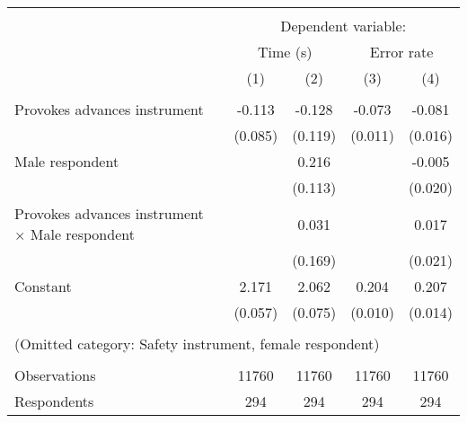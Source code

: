 {\begin{tabular}{l*{4}{c}} \hline\hline \\[-1.8ex] & \multicolumn{4}{c}{Dependent variable:} \\
                    &\multicolumn{2}{c}{Time (s)}               &\multicolumn{2}{c}{Error rate}             \\\cmidrule(lr){2-3}\cmidrule(lr){4-5}
                    &\multicolumn{1}{c}{(1)}         &\multicolumn{1}{c}{(2)}         &\multicolumn{1}{c}{(3)}         &\multicolumn{1}{c}{(4)}         \\
\hline \\[-1.8ex]
Provokes advances instrument&      -0.113         &      -0.128         &      -0.073\sym{***}&      -0.081\sym{***}\\
                    &     (0.085)         &     (0.119)         &     (0.011)         &     (0.016)         \\
[1em]
Male respondent     &                     &       0.216\sym{*}  &                     &      -0.005         \\
                    &                     &     (0.113)         &                     &     (0.020)         \\
[1em]
Provokes advances instrument $\times$ Male respondent&                     &       0.031         &                     &       0.017         \\
                    &                     &     (0.169)         &                     &     (0.021)         \\
[1em]
Constant            &       2.171\sym{***}&       2.062\sym{***}&       0.204\sym{***}&       0.207\sym{***}\\
                    &     (0.057)         &     (0.075)         &     (0.010)         &     (0.014)         \\
\\[-1.8ex] \multicolumn{5}{l}{(Omitted category: Safety instrument, female respondent)} \\ \hline \\[-1.8ex]
Observations        &       11760         &       11760         &       11760         &       11760         \\
Respondents         &         294         &         294         &         294         &         294         \\
\hline\hline
\end{tabular}
}
